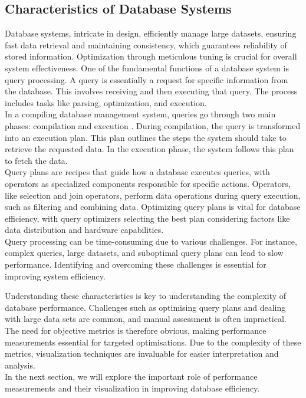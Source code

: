 \subsection{Characteristics of Database Systems}
Database systems, intricate in design, efficiently manage large datasets, ensuring fast data retrieval and maintaining consistency, which guarantees  reliability of stored information. Optimization through meticulous tuning is crucial for overall system effectiveness. One of the fundamental functions of a database system is query processing. A query is essentially a request for specific information from the database. This involves receiving and then executing that query. The process includes tasks like parsing, optimization, and execution.\\
In a compiling database management system, queries go through two main phases: compilation and execution \parencite*{efficiently-compiling}. During compilation, the query is transformed into an execution plan. This plan outlines the steps the system should take to retrieve the requested data. In the execution phase, the system follows this plan to fetch the data.\\
Query plans are recipes that guide how a database executes queries, with operators as specialized components responsible for specific actions. Operators, like selection and join operators, perform data operations during query execution, such as filtering and combining data. Optimizing query plans is vital for database efficiency, with query optimizers selecting the best plan considering factors like data distribution and hardware capabilities.\\
Query processing can be time-consuming due to various challenges. For instance, complex queries, large datasets, and suboptimal query plans can lead to slow performance. Identifying and overcoming these challenges is essential for improving system efficiency.

Understanding these characteristics is key to understanding the complexity of database performance. Challenges such as optimising query plans and dealing with large data sets are common, and manual assessment is often impractical.\\
The need for objective metrics is therefore obvious, making performance measurements essential for targeted optimisations. Due to the complexity of these metrics, visualization techniques are invaluable for easier interpretation and analysis.\\
In the next section, we will explore the important role of performance measurements and their visualization in improving database efficiency.


